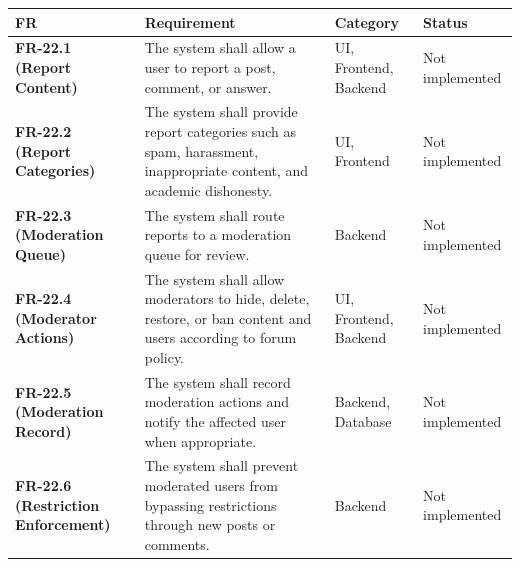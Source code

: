 \documentclass[12pt]{article}
\renewcommand{\baselinestretch}{1.5}
\begin{document}
\begingroup
\small
\renewcommand{\baselinestretch}{1.0}\selectfont
\renewcommand{\arraystretch}{1.15}
\setlength{\tabcolsep}{6pt}
\begin{longtable}{|>{\raggedright\arraybackslash}p{}|>{\raggedright\arraybackslash}p{}|>{\raggedright\arraybackslash}p{}|>{\raggedright\arraybackslash}p{}|}
\hline
\textbf{FR} & \textbf{Requirement} & \textbf{Category} & \textbf{Status} \\ \hline
\endhead
\textbf{FR-22.1 (Report Content)} & The system shall allow a user to report a post, comment, or answer. & UI, Frontend, Backend & Not implemented \\ \hline
\textbf{FR-22.2 (Report Categories)} & The system shall provide report categories such as spam, harassment, inappropriate content, and academic dishonesty. & UI, Frontend & Not implemented \\ \hline
\textbf{FR-22.3 (Moderation Queue)} & The system shall route reports to a moderation queue for review. & Backend & Not implemented \\ \hline
\textbf{FR-22.4 (Moderator Actions)} & The system shall allow moderators to hide, delete, restore, or ban content and users according to forum policy. & UI, Frontend, Backend & Not implemented \\ \hline
\textbf{FR-22.5 (Moderation Record)} & The system shall record moderation actions and notify the affected user when appropriate. & Backend, Database & Not implemented \\ \hline
\textbf{FR-22.6 (Restriction Enforcement)} & The system shall prevent moderated users from bypassing restrictions through new posts or comments. & Backend & Not implemented \\ \hline
\end{longtable}
\endgroup
\par\medskip

\par\medskip
\hypertarget{sec:ui-prototype-specimens}{}
\end{document}
